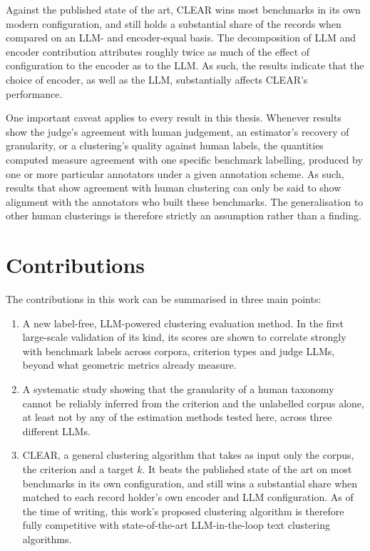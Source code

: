 \documentclass[11pt,a4paper,oneside]{report}
\begin{document}
Against the published state of the art, CLEAR wins most benchmarks in its own modern configuration, and still holds a substantial share of the records when compared on an LLM- and encoder-equal basis. The decomposition of LLM and encoder contribution attributes roughly twice as much of the effect of configuration to the encoder as to the LLM. As such, the results indicate that the choice of encoder, as well as the LLM, substantially affects CLEAR's performance. 

One important caveat applies to every result in this thesis.
Whenever results show the judge's agreement with human
judgement, an estimator's recovery of granularity, or a
clustering's quality against human labels, the quantities computed measure agreement with one specific benchmark labelling, produced
by one or more particular annotators under a given annotation scheme. As such, results that show agreement with human clustering can only be said to show alignment with the annotators who built these benchmarks. The generalisation to other
human clusterings is therefore strictly an assumption rather than a finding.


\section{Contributions}

The contributions in this work can be summarised in three main points:
\begin{enumerate}
    \item A new label-free, LLM-powered clustering evaluation method. In the first large-scale validation of its kind, its scores are shown to correlate strongly
    with benchmark labels across corpora, criterion types and judge LLMs,
    beyond what geometric metrics already measure.
    \item A systematic study showing that the granularity of a human
    taxonomy cannot be reliably inferred from the criterion and the
    unlabelled corpus alone, at least not by any of the
    estimation methods tested here, across three different LLMs.
     \item CLEAR, a general clustering algorithm that takes as input only the corpus, the criterion and a target $k$. It beats the published state of the art on most benchmarks in its own configuration, and still wins a substantial share when matched to each record holder's own encoder and LLM configuration. As of the time of writing, this work's proposed clustering algorithm is therefore fully competitive with state-of-the-art LLM-in-the-loop text clustering algorithms.

\end{enumerate}
\end{document}
